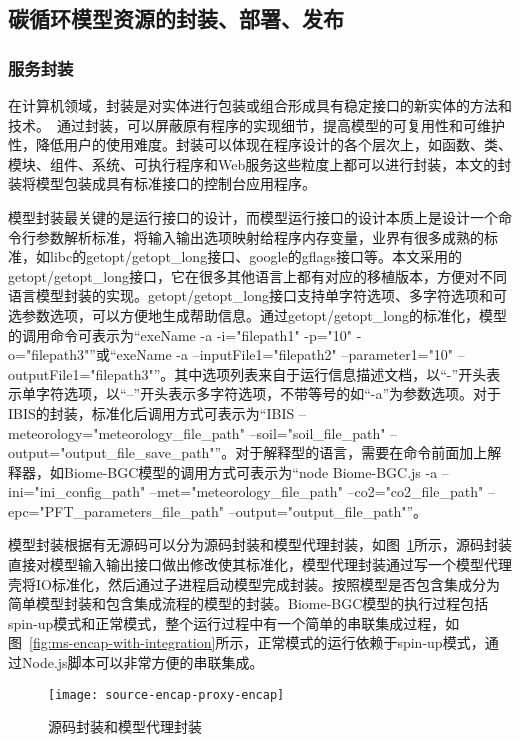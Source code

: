 \subsection{碳循环模型资源的封装、部署、发布}
\label{subsec:ms-encapp}
\subsubsection{服务封装}
在计算机领域，封装是对实体进行包装或组合形成具有稳定接口的新实体的方法和技术。~\cite{胡迪2015地理模型的服务化封装方法研究}通过封装，可以屏蔽原有程序的实现细节，提高模型的可复用性和可维护性，降低用户的使用难度。封装可以体现在程序设计的各个层次上，如函数、类、模块、组件、系统、可执行程序和Web服务这些粒度上都可以进行封装，本文的封装将模型包装成具有标准接口的控制台应用程序。

模型封装最关键的是运行接口的设计，而模型运行接口的设计本质上是设计一个命令行参数解析标准，将输入输出选项映射给程序内存变量，业界有很多成熟的标准，如libc的getopt/getopt\_long接口、google的gflags接口等。本文采用的getopt/getopt\_long接口，它在很多其他语言上都有对应的移植版本，方便对不同语言模型封装的实现。getopt/getopt\_long接口支持单字符选项、多字符选项和可选参数选项，可以方便地生成帮助信息。通过getopt/getopt\_long的标准化，模型的调用命令可表示为“exeName -a -i="filepath1" -p="10" -o="filepath3"”或“exeName -a --inputFile1="filepath2" --parameter1="10" --outputFile1="filepath3"”。其中选项列表来自于运行信息描述文档，以“-”开头表示单字符选项，以“--”开头表示多字符选项，不带等号的如“-a”为参数选项。对于IBIS的封装，标准化后调用方式可表示为“IBIS --meteorology="meteorology\_file\_path" --soil="soil\_file\_path" --output="output\_file\_save\_path"”。对于解释型的语言，需要在命令前面加上解释器，如Biome-BGC模型的调用方式可表示为“node Biome-BGC.js -a --ini="ini\_config\_path" --met="meteorology\_file\_path" --co2="co2\_file\_path" --epc="PFT\_parameters\_file\_path" --output="output\_file\_path"”。

模型封装根据有无源码可以分为源码封装和模型代理封装，如图~\ref{fig:source-encap-proxy-encap}所示，源码封装直接对模型输入输出接口做出修改使其标准化，模型代理封装通过写一个模型代理壳将IO标准化，然后通过子进程启动模型完成封装。按照模型是否包含集成分为简单模型封装和包含集成流程的模型的封装。Biome-BGC模型的执行过程包括spin-up模式和正常模式，整个运行过程中有一个简单的串联集成过程，如图~\ref{fig:ms-encap-with-integration}所示，正常模式的运行依赖于spin-up模式，通过Node.js脚本可以非常方便的串联集成。

\begin{figure}[!htbp]
    \centering
    \texttt{[image: source-encap-proxy-encap]}
    \caption{源码封装和模型代理封装}
    \label{fig:source-encap-proxy-encap}
\end{figure}

